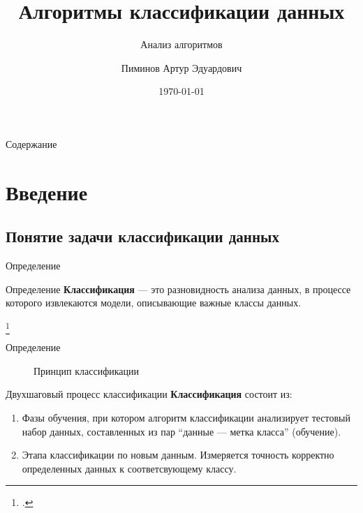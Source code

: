 \documentclass{beamer}
\title %
{Алгоритмы классификации данных}
\subtitle
{Анализ алгоритмов} %
\author[Пиминов А.Э.] %
{Пиминов Артур Эдуардович}
\institute[НГУ] %
{
  Группа 23224\\
  Факультет информационных технологий\\
  Новосибирский государственный университет
}
\date[\today] %
{\today}
\begin{document}
\begin{frame}
  \titlepage
\end{frame}

\begin{frame}{Содержание}
  \tableofcontents
\end{frame}



\section{Введение}

\subsection{Понятие задачи классификации данных}

\begin{frame}{Определение}
  \begin{block}{Определение} 
    \textbf{Классификация} — это разновидность анализа данных, в процессе которого извлекаются модели, описывающие важные классы данных\footnotemark. 
  \end{block}\footcitetext{Jiawei2012}
  \vfill
\end{frame}


\begin{frame}{Определение}
\begin{figure}
    \caption{Принцип классификации}
  \end{figure}
\end{frame}


  


\begin{frame}{Двухшаговый процесс классификации}
  \textbf{Классификация} состоит из:
  \begin{enumerate}
    \item Фазы обучения, при котором алгоритм классификации анализирует тестовый набор данных, составленных из пар ``данные — метка класса'' (обучение).
      \pause
    \item Этапа классификации по новым данным. Измеряется точность корректно определенных данных к соответсвующему классу.
  \end{enumerate}
\end{frame}
\end{document}
